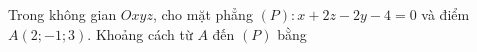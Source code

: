 \begin{ex}
Trong không gian $Oxyz$, cho mặt phẳng $(P)\colon x+2z-2y-4=0$ và điểm $A(2;-1;3)$. Khoảng cách từ $A$ đến $(P)$ bằng
\end{ex}
